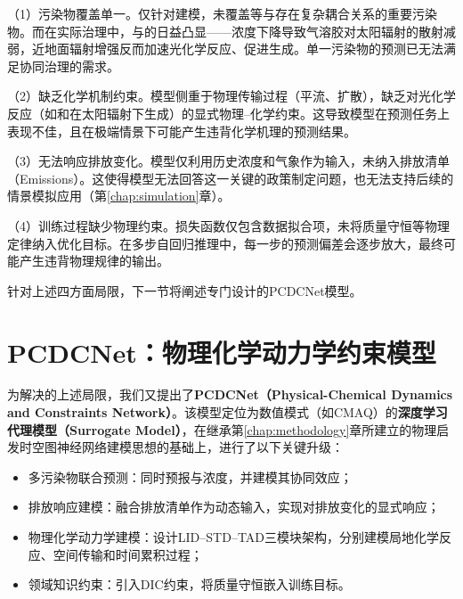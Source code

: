 （1）污染物覆盖单一。\ModelPred{}仅针对\PM 建模，未覆盖\ozone 等与\PM 存在复杂耦合关系的重要污染物。而在实际治理中，\PM 与\ozone 的日益凸显——\PM 浓度下降导致气溶胶对太阳辐射的散射减弱，近地面辐射增强反而加速光化学反应、促进\ozone 生成\citep{qu2023underlying}。单一污染物的预测已无法满足协同治理的需求。

（2）缺乏化学机制约束。模型侧重于物理传输过程（平流、扩散），缺乏对光化学反应（如\VOCs{}和\NOx 在太阳辐射下生成\ozone）的显式物理--化学约束。这导致模型在\ozone 预测任务上表现不佳，且在极端情景下可能产生违背化学机理的预测结果。

（3）无法响应排放变化。模型仅利用历史浓度和气象作为输入，未纳入排放清单（Emissions）。这使得模型无法回答这一关键的政策制定问题，也无法支持后续的情景模拟应用（第\ref{chap:simulation}章）。

（4）训练过程缺少物理约束。损失函数仅包含数据拟合项，未将质量守恒等物理定律纳入优化目标。在多步自回归推理中，每一步的预测偏差会逐步放大，最终可能产生违背物理规律的输出。

针对上述四方面局限，下一节将阐述专门设计的PCDCNet模型。


\section{PCDCNet：物理化学动力学约束模型}
\label{sec:pcdcnet}

为解决\ModelPred{}的上述局限，我们又提出了\textbf{PCDCNet（Physical-Chemical Dynamics and Constraints Network）}\citep{wang2025pcdcnet}。该模型定位为数值模式（如CMAQ）的\textbf{深度学习代理模型（Surrogate Model）}，在继承第\ref{chap:methodology}章所建立的物理启发时空图神经网络建模思想的基础上，进行了以下关键升级：

\begin{itemize}
    \item 多污染物联合预测：同时预报\PM 与\ozone 浓度，并建模其协同效应；
    \item 排放响应建模：融合排放清单作为动态输入，实现对排放变化的显式响应；
    \item 物理化学动力学建模：设计LID--STD--TAD三模块架构，分别建模局地化学反应、空间传输和时间累积过程；
    \item 领域知识约束：引入DIC约束，将质量守恒嵌入训练目标。
\end{itemize}


